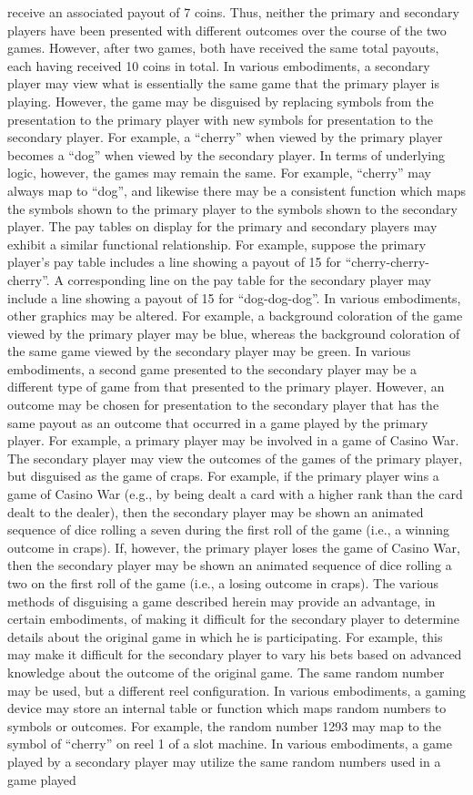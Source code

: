 \documentclass[11pt,a4paper]{article}
\begin{document}
receive an associated payout of 7 coins. Thus, neither the primary and secondary players have been presented with different outcomes over the course of the two games. However, after two games, both have received the same total payouts, each having received 10 coins in total. In various embodiments, a secondary player may view what is essentially the same game that the primary player is playing. However, the game may be disguised by replacing symbols from the presentation to the primary player with new symbols for presentation to the secondary player. For example, a “cherry” when viewed by the primary player becomes a “dog” when viewed by the secondary player. In terms of underlying logic, however, the games may remain the same. For example, “cherry” may always map to “dog”, and likewise there may be a consistent function which maps the symbols shown to the primary player to the symbols shown to the secondary player. The pay tables on display for the primary and secondary players may exhibit a similar functional relationship. For example, suppose the primary player's pay table includes a line showing a payout of 15 for “cherry-cherry-cherry”. A corresponding line on the pay table for the secondary player may include a line showing a payout of 15 for “dog-dog-dog”. In various embodiments, other graphics may be altered. For example, a background coloration of the game viewed by the primary player may be blue, whereas the background coloration of the same game viewed by the secondary player may be green. In various embodiments, a second game presented to the secondary player may be a different type of game from that presented to the primary player. However, an outcome may be chosen for presentation to the secondary player that has the same payout as an outcome that occurred in a game played by the primary player. For example, a primary player may be involved in a game of Casino War. The secondary player may view the outcomes of the games of the primary player, but disguised as the game of craps. For example, if the primary player wins a game of Casino War (e.g., by being dealt a card with a higher rank than the card dealt to the dealer), then the secondary player may be shown an animated sequence of dice rolling a seven during the first roll of the game (i.e., a winning outcome in craps). If, however, the primary player loses the game of Casino War, then the secondary player may be shown an animated sequence of dice rolling a two on the first roll of the game (i.e., a losing outcome in craps). The various methods of disguising a game described herein may provide an advantage, in certain embodiments, of making it difficult for the secondary player to determine details about the original game in which he is participating. For example, this may make it difficult for the secondary player to vary his bets based on advanced knowledge about the outcome of the original game. The same random number may be used, but a different reel configuration. In various embodiments, a gaming device may store an internal table or function which maps random numbers to symbols or outcomes. For example, the random number 1293 may map to the symbol of “cherry” on reel 1 of a slot machine. In various embodiments, a game played by a secondary player may utilize the same random numbers used in a game played 
\end{document}
